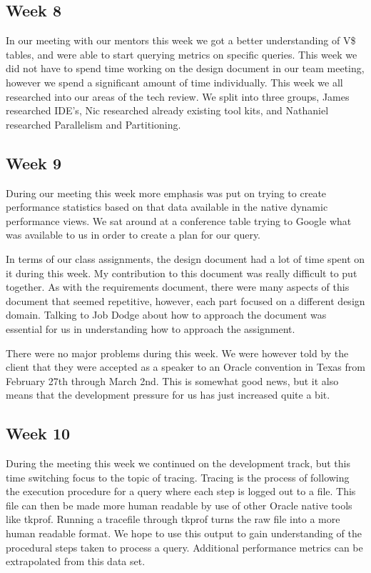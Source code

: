 \documentclass[draftclsnofoot, onecolumn, compsoc, 10pt]{IEEEtran}
\begin{document}
\subsection{Week 8}
In our meeting with our mentors this week we got a better understanding of V\$ tables, and were able to start querying metrics on specific queries. This week we did not have to spend time working on the design document in our team meeting, however we spend a significant amount of time individually. 
This week we all researched into our areas of the tech review. We split into three groups, James researched IDE's, Nic researched already existing tool kits, and Nathaniel researched Parallelism and Partitioning.

\subsection{Week 9}
During our meeting this week more emphasis was put on trying to create performance statistics based on that data available in the native dynamic performance views.
We sat around at a conference table trying to Google what was available to us in order to create a plan for our query.

In terms of our class assignments, the design document had a lot of time spent on it during this week. 
My contribution to this document was really difficult to put together.
As with the requirements document, there were many aspects of this document that seemed repetitive, however, each part focused on a different design domain.
Talking to Job Dodge about how to approach the document was essential for us in understanding how to approach the assignment.

There were no major problems during this week. We were however told by the client that they were accepted as a speaker to an Oracle convention in Texas from February 27th through March 2nd.
This is somewhat good news, but it also means that the development pressure for us has just increased quite a bit.

\subsection{Week 10}
During the meeting this week we continued on the development track, but this time switching focus to the topic of tracing.
Tracing is the process of following the execution procedure for a query where each step is logged out to a file.
This file can then be made more human readable by use of other Oracle native tools like tkprof.
Running a tracefile through tkprof turns the raw file into a more human readable format.
We hope to use this output to gain understanding of the procedural steps taken to process a query.
Additional performance metrics can be extrapolated from this data set.
\end{document}

